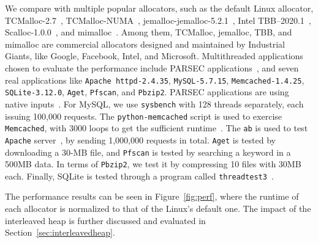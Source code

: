  We compare \NM{} with multiple popular allocators, such as the default Linux allocator, TCMalloc-2.7~\citep{tcmalloc},  TCMalloc-NUMA~\citep{tcmallocnew}, jemalloc-jemalloc-5.2.1~\citep{jemalloc}, Intel TBB--2020.1~\citep{tbb}, Scalloc-1.0.0~\citep{Scalloc}, and mimalloc~\citep{mimalloc}. Among them, TCMalloc, jemalloc, TBB, and mimalloc are commercial allocators designed and maintained by Industrial Giants, like Google, Facebook, Intel, and Microsoft.   
Multithreaded applications chosen to evaluate the performance include PARSEC applications~\citep{parsec}, and seven real applications like \texttt{Apache httpd-2.4.35}, \texttt{MySQL-5.7.15}, \texttt{Memcached-1.4.25}, \texttt{SQLite-3.12.0}, \texttt{Aget}, \texttt{Pfscan}, and \texttt{Pbzip2}. 
PARSEC applications are using native inputs~\citep{parsec}. For MySQL, we use \texttt{sysbench} with 128 threads separately, each issuing 100,000 requests. The \texttt{python-memcached} script is used to exercise \texttt{Memcached}, with 3000 loops to get the sufficient runtime~\citep{memcached}. The \texttt{ab} is used to test \texttt{Apache} server~\citep{apachetest}, by sending 1,000,000 requests in total. \texttt{Aget} is tested by downloading a 30-MB file, and \texttt{Pfscan} is tested by searching  a keyword in a 500MB data. In terms of \texttt{Pbzip2}, we test it by compressing 10 files with 30MB each. Finally, SQLite is tested through a program called \texttt{threadtest3}~\citep{sqlitetest}. 



 The performance results can be seen in Figure~\ref{fig:perf}, where the runtime of each allocator is normalized to that of the Linux's default one.  The impact of the interleaved heap is further discussed and evaluated in Section~\ref{sec:interleavedheap}. 
 
